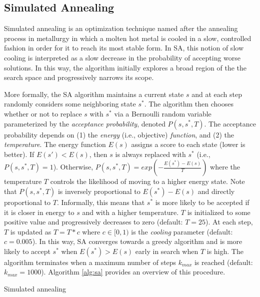 \subsection{Simulated Annealing}\label{sec:sa}

Simulated annealing is an optimization technique named after the annealing process in metallurgy in which a molten hot metal is cooled in a slow, controlled fashion in order for it to reach its most stable form.
In SA, this notion of slow cooling is interpreted as a slow decrease in the probability of accepting worse solutions.
In this way, the algorithm initially explores a broad region of the the search space and progressively narrows its scope.

More formally, the SA algorithm maintains a current state $s$ and at each step randomly considers some neighboring state $s^*$.
The algorithm then chooses whether or not to replace $s$ with $s^*$ via a Bernoulli random variable parameterized by the \emph{acceptance probability}, denoted $P(s, s^*, T)$. %
The acceptance probability depends on (1) the \emph{energy} (i.e., objective) \emph{function}, and (2) the \emph{temperature}.
The energy function $E(s)$ assigns a score to each state (lower is better).
If $E(s') < E(s)$, then $s$ is always replaced with $s^*$ (i.e., $P(s, s^*, T) = 1$).
Otherwise, $P(s, s^*, T) = exp(-\frac{E(s^*) - E(s)}{T})$ where the temperature $T$ controls the likelihood of moving to a higher energy state.
Note that $P(s, s^*, T)$ is inversely proportional to $E(s^*) - E(s)$ and directly proportional to $T$.
Informally, this means that $s^*$ is more likely to be accepted if it is closer in energy to $s$ and with a higher temperature.
$T$ is initialized to some positive value and progressively decreases to zero (default: $T = 25$).
At each step, $T$ is updated as $T = T * c$ where $c \in [0, 1)$ is the \emph{cooling} parameter (default: $c = 0.005$). %
In this way, SA converges towards a greedy algorithm and is more likely to accept $s^*$ when $E(s^*) > E(s)$ early in search when $T$ is high.
The algorithm terminates when a maximum number of steps $k_{max}$ is reached (default: $k_{max} = 1000$).
Algorithm \ref{alg:sa} provides an overview of this procedure.

\begin{algorithm}[t]
  \caption{Simulated annealing
    \label{alg:sa}}
  \begin{algorithmic}[1]
        \EndIf
      \EndFor
      \State {}
    \EndFunction
  \end{algorithmic}
\end{algorithm}

